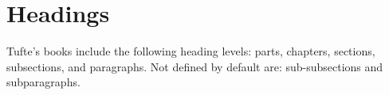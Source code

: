 \documentclass[a4paper,nofonts,notoc,oneside,openany,nobib]{tufte-book}
\newcommand{\TL}{Tufte-\LaTeX\xspace}
\newcommand{\na}{\quad--}%
\begin{document}

\section{Headings}\label{sec:headings1}

Tufte's books include the following heading levels: parts,
chapters,  sections, subsections, and paragraphs.  Not defined by default
are: sub-subsections and subparagraphs.
\end{document}

